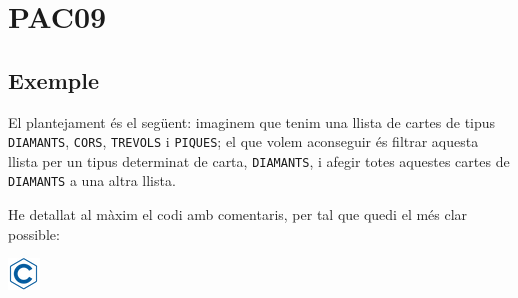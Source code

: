 \documentclass[]{book}
\begin{document}
\chapter{PAC09}\label{pac09}

\section{Exemple}\label{exemple}

El plantejament és el següent: imaginem que tenim una llista de cartes
de tipus \texttt{DIAMANTS}, \texttt{CORS}, \texttt{TREVOLS} i
\texttt{PIQUES}; el que volem aconseguir és filtrar aquesta llista per
un tipus determinat de carta, \texttt{DIAMANTS}, i afegir totes aquestes
cartes de \texttt{DIAMANTS} a una altra llista.

He detallat al màxim el codi amb comentaris, per tal que quedi el més
clar possible:

\includegraphics{./img/c.png}
\end{document}

